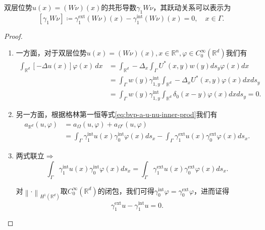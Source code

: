 \begin{lemma}
  双层位势$u(x) = \left(W \nu \right)(x)$的共形导数$\gamma_{1} W \nu $，其跃动关系可以表示为
  \begin{equation}
    \label{eq:bvp-double-layer-gamma1-jumprelation}
    \left[ \gamma_{1} W \nu \right]
    \coloneqq \gamma_{1}^{\text{ext}} \left(W \nu \right)(x)
    - \gamma_{1}^{\text{int}} \left( W \nu \right)(x)
    =0, \quad x \in \Gamma.
  \end{equation}
\end{lemma}
\begin{proof}
  \begin{enumerate}
    \item 一方面，对于双层位势$u(x) = \left( W \nu \right)(x), x \in \mathbb{R}^{n}, \varphi \in C_{0}^{\infty}(\mathbb{R}^d)$我们有
    \begin{equation*}
      \begin{split}
        \int_{\mathbb{R}^d}
        \left[
        - \Delta u(x)
        \right]
        \varphi(x) \, d x &=
        \int_{\mathbb{R}^d}
        - \Delta_{x}
        \int_{\Gamma}
        U^{*}(x,y) w(y) ds_y
        \varphi(x) dx \\
        &= \int_{\Gamma} w(y)
        \gamma_{1,y}^{\text{int}}
        \int_{\mathbb{R}^d}
        - \Delta_{x} U^{*}(x,y) \varphi(x) dx
        d s_y \\
        & = \int_{\Gamma} w(y) \gamma_{1,y}^{\text{int}}
        \int_{\mathbb{R}^d} \delta_{0}(x-y) \varphi(x) d x d s_y
        =0.
      \end{split}
    \end{equation*}
    \item 另一方面，根据格林第一恒等式\eqref{eq:bvp-a-u-nu-inner-prod}我们有
    \begin{equation*}
      \begin{split}
        a_{\mathbb{R}^d}(u,\varphi)
        & = a_{\Omega}(u, \varphi) + a_{\Omega^{c}}(u, \varphi)\\
        & = \int_{\Gamma} \gamma_{1}^{\text{int}} u(x) \gamma_{0}^{\text{int}} \varphi(x) d s_x
        - \int_{\Gamma} \gamma_{1}^{\text{ext}} u(x) \gamma_{0}^{\text{ext}} \varphi(x) d s_x.
      \end{split}
    \end{equation*}
    \item 两式联立$\Rightarrow$
    \begin{equation*}
      \int_{\Gamma} \gamma_{1}^{\text{int}} u(x) \gamma_{0}^{\text{int}} \varphi(x) d s_x
      = \int_{\Gamma} \gamma_{1}^{\text{ext}} u(x)
      \gamma_{0}^{\text{ext}} \varphi(x) d s_x.
    \end{equation*}

    对$\left\| \cdot \right\|_{H^{1}(\mathbb{R}^d)}$取$C_{0}^{\infty}(\mathbb{R}^d)$的闭包，我们可得$\gamma_0^{\text{int}} \varphi = \gamma_{0}^{\text{ext}} \varphi$，进而证得
    \begin{equation*}
      \gamma_{1}^{\text{ext}} u - \gamma_{1}^{\text{int}} u = 0.
    \end{equation*}
  \end{enumerate}
\end{proof}

